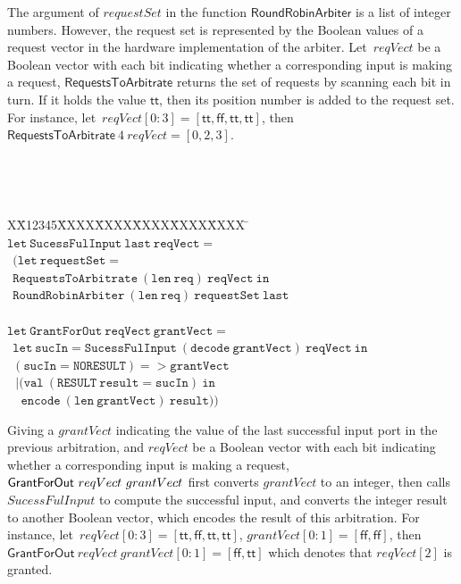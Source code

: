 \documentclass[final]{IEEEtran}
\newlength{\fminilength}
\newenvironment{fmini}[1][\linewidth]
  {\setlength{\fminilength}{#1\fboxsep-2\fboxrule}%
   \vspace{2ex}\noindent\begin{lrbox}{\fminibox}\begin{minipage}{\fminilength}%
   \mbox{ }\hfill\vspace{-2.5ex}}%
  {\end{minipage}\end{lrbox}\vspace{1ex}\hspace{0ex}%
   \framebox{\usebox{\fminibox}}}
\newenvironment{specification}
{\noindent\footnotesize\tt\begin{fmini}\begin{tabbing}X\=X12345\=XXXX\=XXXX\=XXXX\=XXXX\=XXXX
\=\+\kill} {\end{tabbing}\normalfont\end{fmini}}
\begin{document}
The argument of $requestSet$ in the function
$\mathsf{RoundRobinArbiter}$ is a list of integer numbers. However,
the request set is represented by the Boolean values of a request
vector in the hardware implementation of the arbiter. Let\ $reqVect$
be a Boolean vector with each bit indicating whether a corresponding
input is making a request, $\mathsf{RequestsToArbitrate}$ returns
the set of requests by scanning each bit in turn. If it holds the
value $\mathsf{tt}$, then its position number is added to the
request set. For instance, let\
$reqVect[0:3]=[\mathsf{tt},\mathsf{ff},\mathsf{tt},\mathsf{tt}]$, then
$\mathsf{RequestsToArbitrate}\ 4\ reqVect=[0,2,3]$. \vspace{2mm}
{\footnotesize
\begin{specification}
$\mathtt{let\ SucessFulInput\ last\ reqVect=}$\\

$\mathtt{\ \ (let\ requestSet=}$\\
$\mathtt{\ \ RequestsToArbitrate\ (len\ req)\ reqVect\ in}$%
\\

$\mathtt{\ \ RoundRobinArbiter\ (len\ req)\ requestSet\ last}$\\

\\

$\mathtt{let\ GrantForOut\ reqVect\ grantVect=}$\\

$\mathtt{\ \ let\ sucIn=SucessFulInput\ (decode\ grantVect)\ reqVect\ in}$\\

$\mathtt{\ \ (sucIn=NORESULT)=>grantVect}$\\

$\mathtt{\ \ \ |(val\ (RESULT\ result=sucIn)\ in}$\\

$\mathtt{\ \ \ \ \ encode\ (len\ grantVect)\ result}))$
\end{specification}}
\vspace{2mm}

 Giving a $grantVect$ indicating the value of the last
successful input port in the previous arbitration, and $reqVect$ be
a Boolean vector with each bit
indicating whether a corresponding input is making a request, $\mathsf{%
GrantForOut}\ reqVect \ grantVect$ first converts $grantVect$ to an
integer, then calls $SucessFulInput$ to compute the   successful
input, and converts the integer result to another Boolean vector,
which encodes the
result of this arbitration. For instance, let\  $reqVect[0:3]=[\mathsf{tt},\mathsf{ff},\mathsf{tt},\mathsf{tt}]$,
$grantVect[0:1]=[\mathsf{ff},\mathsf{ff}]$, then $%
\mathsf{GrantForOut}\ reqVect \
grantVect[0:1]=[\mathsf{ff},\mathsf{tt}]$ which denotes that $reqVect[2]$ is granted.
\end{document}
